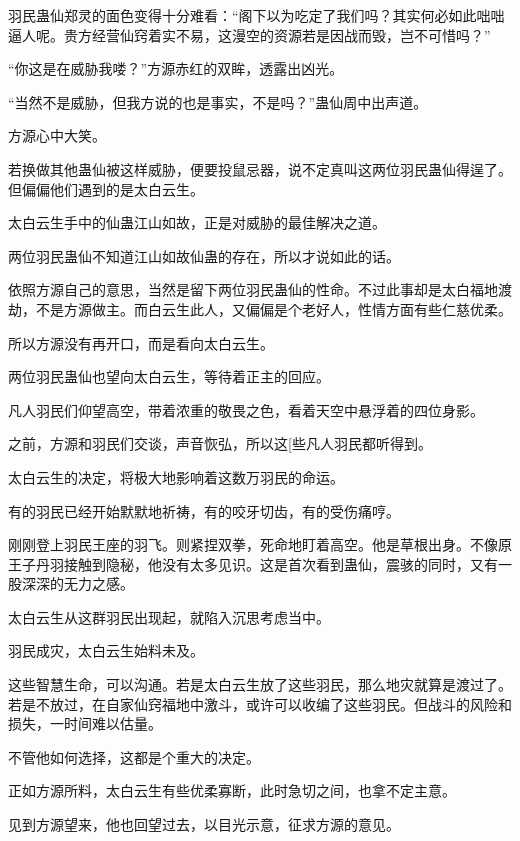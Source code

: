 
\begin{this_body}

羽民蛊仙郑灵的面色变得十分难看：“阁下以为吃定了我们吗？其实何必如此咄咄逼人呢。贵方经营仙窍着实不易，这漫空的资源若是因战而毁，岂不可惜吗？”

“你这是在威胁我喽？”方源赤红的双眸，透露出凶光。

“当然不是威胁，但我方说的也是事实，不是吗？”蛊仙周中出声道。

方源心中大笑。

若换做其他蛊仙被这样威胁，便要投鼠忌器，说不定真叫这两位羽民蛊仙得逞了。但偏偏他们遇到的是太白云生。

太白云生手中的仙蛊江山如故，正是对威胁的最佳解决之道。

两位羽民蛊仙不知道江山如故仙蛊的存在，所以才说如此的话。

依照方源自己的意思，当然是留下两位羽民蛊仙的性命。不过此事却是太白福地渡劫，不是方源做主。而白云生此人，又偏偏是个老好人，性情方面有些仁慈优柔。

所以方源没有再开口，而是看向太白云生。

两位羽民蛊仙也望向太白云生，等待着正主的回应。

凡人羽民们仰望高空，带着浓重的敬畏之色，看着天空中悬浮着的四位身影。

之前，方源和羽民们交谈，声音恢弘，所以这[些凡人羽民都听得到。

太白云生的决定，将极大地影响着这数万羽民的命运。

有的羽民已经开始默默地祈祷，有的咬牙切齿，有的受伤痛哼。

刚刚登上羽民王座的羽飞。则紧捏双拳，死命地盯着高空。他是草根出身。不像原王子丹羽接触到隐秘，他没有太多见识。这是首次看到蛊仙，震骇的同时，又有一股深深的无力之感。

太白云生从这群羽民出现起，就陷入沉思考虑当中。

羽民成灾，太白云生始料未及。

这些智慧生命，可以沟通。若是太白云生放了这些羽民，那么地灾就算是渡过了。若是不放过，在自家仙窍福地中激斗，或许可以收编了这些羽民。但战斗的风险和损失，一时间难以估量。

不管他如何选择，这都是个重大的决定。

正如方源所料，太白云生有些优柔寡断，此时急切之间，也拿不定主意。

见到方源望来，他也回望过去，以目光示意，征求方源的意见。


\end{this_body}
